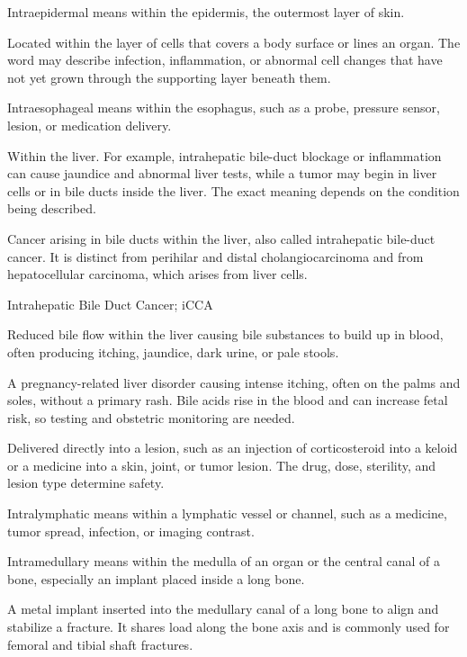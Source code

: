  Intraepidermal means within the epidermis, the outermost layer of skin.

 Located within the layer of cells that covers a body surface or lines an organ. The word may describe infection, inflammation, or abnormal cell changes that have not yet grown through the supporting layer beneath them.

 Intraesophageal means within the esophagus, such as a probe, pressure sensor, lesion, or medication delivery.

 Within the liver. For example, intrahepatic bile-duct blockage or inflammation can cause jaundice and abnormal liver tests, while a tumor may begin in liver cells or in bile ducts inside the liver. The exact meaning depends on the condition being described.

 Cancer arising in bile ducts within the liver, also called intrahepatic bile-duct cancer. It is distinct from perihilar and distal cholangiocarcinoma and from hepatocellular carcinoma, which arises from liver cells.

\synonyms
Intrahepatic Bile Duct Cancer; iCCA

 Reduced bile flow within the liver causing bile substances to build up in blood, often producing itching, jaundice, dark urine, or pale stools.

 A pregnancy-related liver disorder causing intense itching, often on the palms and soles, without a primary rash. Bile acids rise in the blood and can increase fetal risk, so testing and obstetric monitoring are needed.

 Delivered directly into a lesion, such as an injection of corticosteroid into a keloid or a medicine into a skin, joint, or tumor lesion. The drug, dose, sterility, and lesion type determine safety.

 Intralymphatic means within a lymphatic vessel or channel, such as a medicine, tumor spread, infection, or imaging contrast.

 Intramedullary means within the medulla of an organ or the central canal of a bone, especially an implant placed inside a long bone.

 A metal implant inserted into the medullary canal of a long bone to align and stabilize
a fracture. It shares load along the bone axis and is commonly used for femoral and
tibial shaft fractures.

